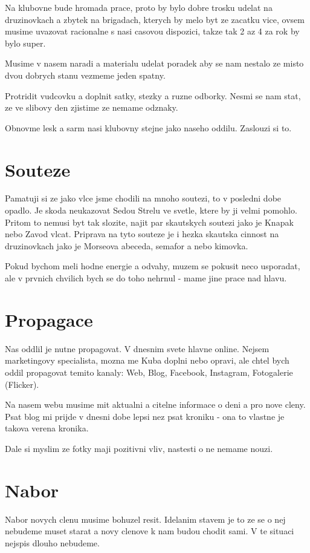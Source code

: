 \documentclass[12pt,a4paper]{article}
\begin{document}
Na klubovne bude hromada prace, proto by bylo dobre trosku udelat na druzinovkach a zbytek na brigadach, kterych by melo byt ze zacatku vice, ovsem musime uvazovat racionalne s nasi casovou dispozici, takze tak 2 az 4 za rok by bylo super.

Musime v nasem naradi a materialu udelat poradek aby se nam nestalo ze misto dvou dobrych stanu vezmeme jeden spatny.

Protridit vudcovku a doplnit satky, stezky a ruzne odborky. Nesmi se nam stat, ze ve slibovy den zjistime ze nemame odznaky.

Obnovme lesk a sarm nasi klubovny stejne jako naseho oddilu. Zaslouzi si to.

\section{Souteze}

Pamatuji si ze jako vlce jsme chodili na mnoho soutezi, to v posledni dobe opadlo. Je skoda neukazovat Sedou Strelu ve svetle, ktere by ji velmi pomohlo. Pritom to nemusi byt tak slozite, najit par skautskych soutezi jako je Knapak nebo Zavod vlcat. Priprava na tyto souteze je i hezka skautska cinnost na druzinovkach jako je Morseova abeceda, semafor a nebo kimovka.

Pokud bychom meli hodne energie a odvahy, muzem se pokusit neco usporadat, ale v prvnich chvilich bych se do toho nehrnul - mame jine prace nad hlavu.


\section{Propagace}

Nas oddlil je nutne propagovat. V dnesnim svete hlavne online. Nejsem marketingovy specialista, mozna me Kuba doplni nebo opravi, ale chtel bych oddil propagovat temito kanaly: Web, Blog, Facebook, Instagram, Fotogalerie (Flicker).

Na nasem webu musime mit aktualni a citelne informace o deni a pro nove cleny. Psat blog mi prijde v dnesni dobe lepsi nez psat kroniku - ona to vlastne je takova verena kronika.

Dale si myslim ze fotky maji pozitivni vliv, nastesti o ne nemame nouzi.


\section{Nabor}

Nabor novych clenu musime bohuzel resit. Idelanim stavem je to ze se o nej nebudeme muset starat a novy clenove k nam budou chodit sami. V te situaci nejspis dlouho nebudeme.
\end{document}
